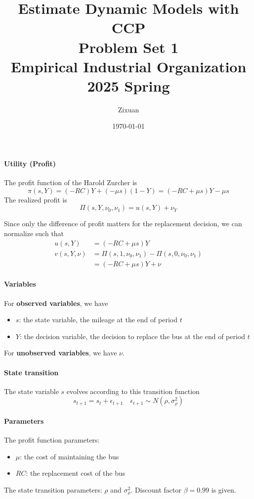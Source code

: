 \documentclass[12pt]{article}[margin=1in]
\title{\textbf{Estimate Dynamic Models with CCP} \\
    \vspace{.3cm}
    \large Problem Set 1 \\
    Empirical Industrial Organization 2025 Spring}
\author{Zixuan}
\date{\today}
\begin{document}
\maketitle

\setcounter{page}{1}

\paragraph{Utility (Profit)}
The profit function of the Harold Zurcher is
\begin{equation*}
    \pi(s,Y) = (-RC)Y + (-\mu s)(1 - Y) = (-RC + \mu s)Y - \mu s
\end{equation*}
The realized profit is
\begin{equation*}
    \Pi(s,Y,\nu_0,\nu_1) = u(s,Y) + \nu_Y
\end{equation*}

Since only the difference of profit matters for the replacement decision, we
can normalize such that
\begin{align*}
    u(s,Y)      & = (-RC + \mu s)Y                              \\
    v(s,Y, \nu) & =  \Pi(s,1,\nu_0,\nu_1) -\Pi(s,0,\nu_0,\nu_1) \\
                & = (-RC + \mu s)Y + \nu
\end{align*}

\paragraph{Variables} For \textbf{observed variables}, we have
\begin{itemize}
    \item $s$: the state variable, the mileage at the end of period $t$
    \item $Y$: the decision variable, the decision to replace the bus at the end of period $t$
\end{itemize}
For \textbf{unobserved variables}, we have $\nu$.
\paragraph{State transition} The state variable $s$ evolves according to this transition function
\begin{equation*}
    s_{t+1} = s_t + \epsilon_{t+1} \quad \epsilon_{t+1} \sim N(\rho, \sigma_{\rho}^2)
\end{equation*}
\paragraph{Parameters} The profit function parameters:
\begin{itemize}
    \item $\mu$: the cost of maintaining the bus
    \item $RC$: the replacement cost of the bus
\end{itemize}
The state transition parameters: $\rho$ and $\sigma_{\rho}^2$.
Discount factor $\beta=0.99$ is given.
\end{document}
